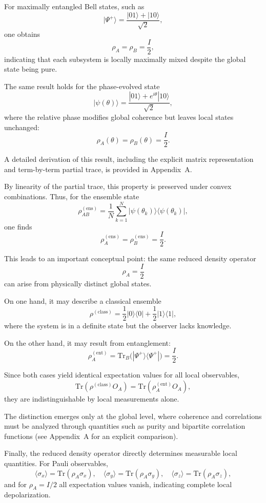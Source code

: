 \documentclass[a4paper]{article}
\begin{document}
For maximally entangled Bell states, such as
\[
|\Psi^+\rangle = \frac{|01\rangle + |10\rangle}{\sqrt{2}},
\]
one obtains
\[
\rho_A = \rho_B = \frac{I}{2},
\]
indicating that each subsystem is locally maximally mixed despite the global state being pure.

The same result holds for the phase-evolved state
\[
|\psi(\theta)\rangle = \frac{|01\rangle + e^{i\theta}|10\rangle}{\sqrt{2}},
\]
where the relative phase modifies global coherence but leaves local states unchanged:
\[
\rho_A(\theta) = \rho_B(\theta) = \frac{I}{2}.
\]

A detailed derivation of this result, including the explicit matrix representation and term-by-term partial trace, is provided in Appendix~A.

By linearity of the partial trace, this property is preserved under convex combinations. Thus, for the ensemble state
\[
\rho_{AB}^{(\mathrm{ens})}
=
\frac{1}{N}
\sum_{k=1}^{N}
|\psi(\theta_k)\rangle\langle\psi(\theta_k)|,
\]
one finds
\[
\rho_A^{(\mathrm{ens})} = \rho_B^{(\mathrm{ens})} = \frac{I}{2}.
\]

This leads to an important conceptual point: the same reduced density operator
\[
\rho_A = \frac{I}{2}
\]
can arise from physically distinct global states.

On one hand, it may describe a classical ensemble
\[
\rho^{(\mathrm{class})}
=
\frac{1}{2}|0\rangle\langle 0|
+
\frac{1}{2}|1\rangle\langle 1|,
\]
where the system is in a definite state but the observer lacks knowledge.

On the other hand, it may result from entanglement:
\[
\rho_A^{(\mathrm{ent})}
=
\mathrm{Tr}_B\big(|\Psi^+\rangle\langle\Psi^+|\big)
=
\frac{I}{2}.
\]

Since both cases yield identical expectation values for all local observables,
\[
\mathrm{Tr}(\rho^{(\mathrm{class})} O_A)
=
\mathrm{Tr}(\rho_A^{(\mathrm{ent})} O_A),
\]
they are indistinguishable by local measurements alone.

The distinction emerges only at the global level, where coherence and correlations must be analyzed through quantities such as purity and bipartite correlation functions (see Appendix~A for an explicit comparison).

Finally, the reduced density operator directly determines measurable local quantities. For Pauli observables,
\[
\langle \sigma_x \rangle = \mathrm{Tr}(\rho_A \sigma_x), \quad
\langle \sigma_y \rangle = \mathrm{Tr}(\rho_A \sigma_y), \quad
\langle \sigma_z \rangle = \mathrm{Tr}(\rho_A \sigma_z),
\]
and for $\rho_A = I/2$ all expectation values vanish, indicating complete local depolarization.
\end{document}
